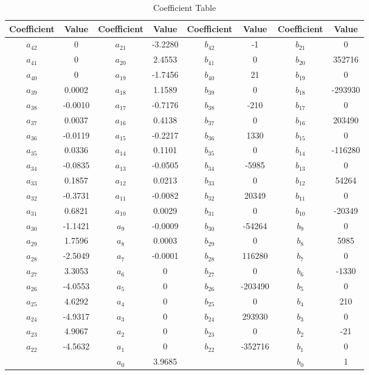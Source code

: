 \documentclass[12pt]{article}
\begin{document}
\begin{table}[h!]
		\begin{center}
		\caption{Coefficient Table}
		\begin{tabular}{|c|c|c|c|c|c|c|c|}
			\hline
			  Coefficient & Value& Coefficient & Value&Coefficient & Value&Coefficient & Value \\
			\hline
			 $a_{42}$&0& $a_{21}$&-3.2280& $b_{42}$&-1& $b_{21}$&0\\
			\hline
			$a_{41}$&0& $a_{20}$&2.4553& $b_{41}$&0& $b_{20}$&352716\\
			\hline
			$a_{40}$&0& $a_{19}$&-1.7456& $b_{40}$&21& $b_{19}$&0\\
			\hline
			$a_{39}$&0.0002& $a_{18}$&1.1589& $b_{39}$&0& $b_{18}$&-293930\\
			\hline
			$a_{38}$&-0.0010& $a_{17}$&-0.7176& $b_{38}$&-210& $b_{17}$&0\\
			\hline
			$a_{37}$&0.0037& $a_{16}$&0.4138& $b_{37}$&0& $b_{16}$&203490\\
			\hline
			$a_{36}$&-0.0119& $a_{15}$&-0.2217& $b_{36}$&1330& $b_{15}$&0\\
			\hline
			$a_{35}$&0.0336& $a_{14}$&0.1101& $b_{35}$&0& $b_{14}$&-116280\\
			\hline
			$a_{34}$&-0.0835& $a_{13}$&-0.0505& $b_{34}$&-5985& $b_{13}$&0\\
			\hline
			$a_{33}$&0.1857& $a_{12}$&0.0213& $b_{33}$&0& $b_{12}$&54264\\
			\hline
			$a_{32}$&-0.3731& $a_{11}$&-0.0082& $b_{32}$&20349& $b_{11}$&0\\
			\hline
			$a_{31}$&0.6821& $a_{10}$&0.0029& $b_{31}$&0& $b_{10}$&-20349\\
			\hline
			$a_{30}$&-1.1421& $a_{9}$&-0.0009& $b_{30}$&-54264& $b_{9}$&0\\
			\hline
			$a_{29}$&1.7596& $a_{8}$&0.0003& $b_{29}$&0& $b_{8}$&5985\\
			\hline
			$a_{28}$&-2.5049& $a_{7}$&-0.0001& $b_{28}$&116280& $b_{7}$&0\\
			\hline
			$a_{27}$&3.3053& $a_{6}$&0& $b_{27}$&0& $b_{6}$&-1330\\
			\hline
			$a_{26}$&-4.0553& $a_{5}$&0& $b_{26}$&-203490& $b_{5}$&0\\
			\hline
			$a_{25}$&4.6292& $a_{4}$&0& $b_{25}$&0& $b_{4}$&210\\
			\hline
			$a_{24}$&-4.9317& $a_{3}$&0& $b_{24}$&293930& $b_{3}$&0\\
			\hline
			$a_{23}$&4.9067& $a_{2}$&0& $b_{23}$&0& $b_{2}$&-21\\
			\hline
			$a_{22}$&-4.5632& $a_{1}$&0& $b_{22}$&-352716& $b_{1}$&0\\
			\hline
			&& $a_{0}$&3.9685& && $b_{0}$&1\\
			\hline
			 
		\end{tabular}
		\end{center}
\end{table}
\newpage
\end{document}
